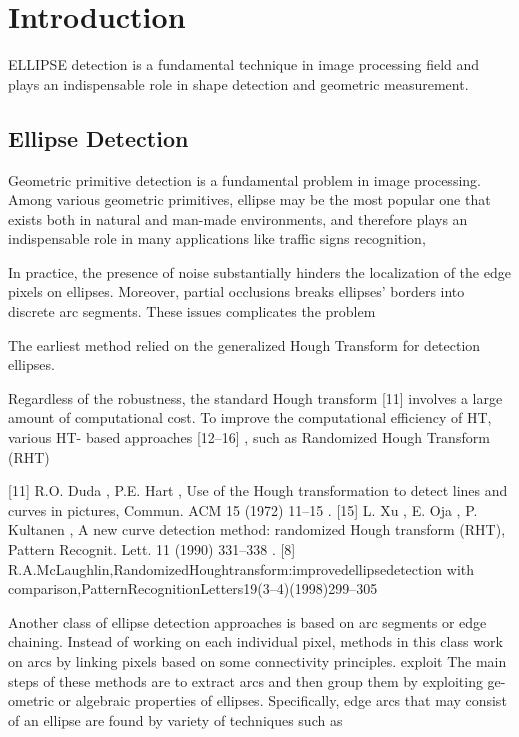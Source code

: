 \documentclass[a4paper]{report}
\begin{document}
\section{Introduction}


ELLIPSE detection is a fundamental technique in image processing field and plays an indispensable role in shape
detection and geometric measurement.


\subsection{Ellipse Detection}
Geometric primitive detection is a fundamental problem in image processing. Among various geometric primitives, ellipse may be the most popular one that exists both in natural and man-made environments, and therefore plays an indispensable role in many applications like traffic signs recognition, 


In practice, the presence of noise substantially hinders the localization of the edge pixels on ellipses. Moreover, partial occlusions breaks ellipses' borders into discrete arc segments. These issues complicates the problem 


The earliest method relied on the generalized Hough Transform for detection ellipses. 


Regardless of the robustness, the standard Hough transform [11] involves a large amount of computational cost.
To improve the computational efficiency of HT, various HT- based approaches [12–16] , such as Randomized Hough Transform (RHT)


[11] R.O. Duda , P.E. Hart , Use of the Hough transformation to detect lines and curves in pictures, Commun. ACM 15 (1972) 11–15 .
[15] L. Xu , E. Oja , P. Kultanen , A new curve detection method: randomized Hough transform (RHT), Pattern Recognit. Lett. 11 (1990) 331–338 .
[8] R.A.McLaughlin,RandomizedHoughtransform:improvedellipsedetection
with comparison,PatternRecognitionLetters19(3–4)(1998)299–305

Another class of ellipse detection approaches is based on arc segments or edge chaining. 
Instead of working on each individual pixel, methods in this class work on arcs by linking pixels based on some connectivity principles.
exploit
The main steps of these methods are to extract arcs and then group them by exploiting ge- ometric or algebraic properties of ellipses.
Specifically, edge arcs that may consist of an ellipse are found by variety of techniques such as
\end{document}

